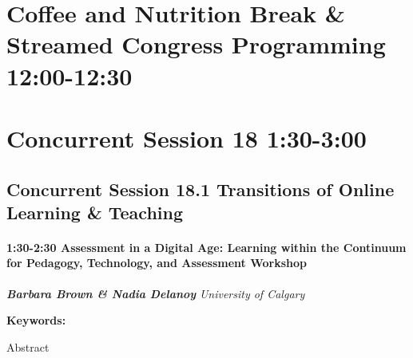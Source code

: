 \documentclass[
]{book}
\begin{document}
\hypertarget{coffee-and-nutrition-break-streamed-congress-programming-1200-1230-1}{%
\section*{Coffee and Nutrition Break \& Streamed Congress Programming \textbar{} 12:00-12:30}\label{coffee-and-nutrition-break-streamed-congress-programming-1200-1230-1}}

\hypertarget{concurrent-session-18-130-300}{%
\section*{Concurrent Session 18 \textbar{} 1:30-3:00}\label{concurrent-session-18-130-300}}

\hypertarget{concurrent-session-18.1-transitions-of-online-learning-teaching}{%
\subsection*{Concurrent Session 18.1 \textbar{} Transitions of Online Learning \& Teaching}\label{concurrent-session-18.1-transitions-of-online-learning-teaching}}

\begin{session}
\hypertarget{assessment-in-a-digital-age-learning-within-the-continuum-for-pedagogy-technology-and-assessment-workshop}{%
\paragraph*{\texorpdfstring{1:30-2:30 \textbar{} \textbf{Assessment in a
Digital Age: Learning within the Continuum for Pedagogy, Technology, and
Assessment} \textbar{}
Workshop}{1:30-2:30 \textbar{} Assessment in a Digital Age: Learning within the Continuum for Pedagogy, Technology, and Assessment \textbar{} Workshop}}\label{assessment-in-a-digital-age-learning-within-the-continuum-for-pedagogy-technology-and-assessment-workshop}}

\textbf{\emph{Barbara Brown \& Nadia Delanoy}} \textbar{}
\emph{University of Calgary}

\textbf{Keywords:}

Abstract
\end{session}
\end{document}
